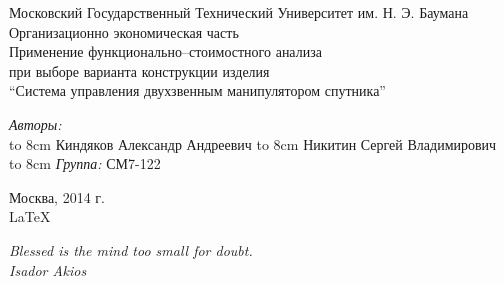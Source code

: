 \documentclass{article}
\begin{document}
\begin{titlepage}
\begin{center}
    {\large Московский Государственный Технический Университет им. Н. Э. Баумана}
    \\[50mm]
    {\Large Организационно экономическая часть}
    \\[7mm]
    {\large Применение функционально--стоимостного анализа \\
            при выборе варианта конструкции изделия \\
            ``Система управления двухзвенным манипулятором спутника''}
    \\[37mm]

    \begin{flushright}
        \begin{minipage}{0.5\textwidth}
            \begin{flushleft}
                \textit{Авторы:} \\
                \hbox to 8cm {Киндяков Александр Андреевич \hfil \underline{\hspace{2cm} } }
                \vspace{\baselineskip}
                \hbox to 8cm {Никитин Сергей Владимирович \hfil \underline{\hspace{2cm} } }
                \vspace{\baselineskip}
                \vspace{2cm}
                \hbox to 8cm {\textit{Группа:} \hfil СМ7-122}
            \end{flushleft}
        \end{minipage}
    \end{flushright}

    \vfill %
    Москва, 2014 г. \\
    \LaTeX
\end{center}
\end{titlepage}
\tableofcontents
\newpage
\begin{flushright}
    \itshape
    Blessed is the mind too small for doubt.\\
    Isador Akios
\end{flushright}


\newpage
\section[Список использованной литературы]{}
\begin{thebibliography}{30}
    
\end{thebibliography}
\end{document}
